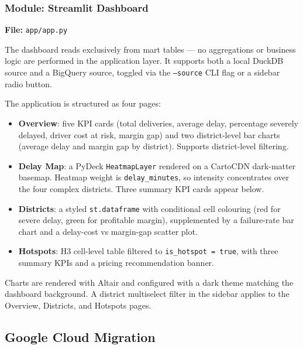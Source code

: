 \subsubsection{Module: Streamlit Dashboard}
\label{sec:streamlit}

\textbf{File:} \texttt{app/app.py}

The dashboard reads exclusively from mart tables — no aggregations or business logic
are performed in the application layer. It supports both a local DuckDB source and a
BigQuery source, toggled via the \texttt{--source} CLI flag or a sidebar radio button.

The application is structured as four pages:

\begin{itemize}
  \item \textbf{Overview}: five KPI cards (total deliveries, average delay, percentage
        severely delayed, driver cost at risk, margin gap) and two district-level bar charts
        (average delay and margin gap by district). Supports district-level filtering.

  \item \textbf{Delay Map}: a PyDeck \texttt{HeatmapLayer} rendered on a CartoCDN
        dark-matter basemap. Heatmap weight is \texttt{delay\_minutes}, so intensity
        concentrates over the four complex districts. Three summary KPI cards appear below.

  \item \textbf{Districts}: a styled \texttt{st.dataframe} with conditional cell
        colouring (red for severe delay, green for profitable margin), supplemented by a
        failure-rate bar chart and a delay-cost vs margin-gap scatter plot.

  \item \textbf{Hotspots}: H3 cell-level table filtered to \texttt{is\_hotspot = true},
        with three summary KPIs and a pricing recommendation banner.
\end{itemize}

Charts are rendered with Altair and configured with a dark theme matching the dashboard
background. A district multiselect filter in the sidebar applies to the Overview,
Districts, and Hotspots pages.

\subsection{Google Cloud Migration}
\label{sec:cloud_migration}

